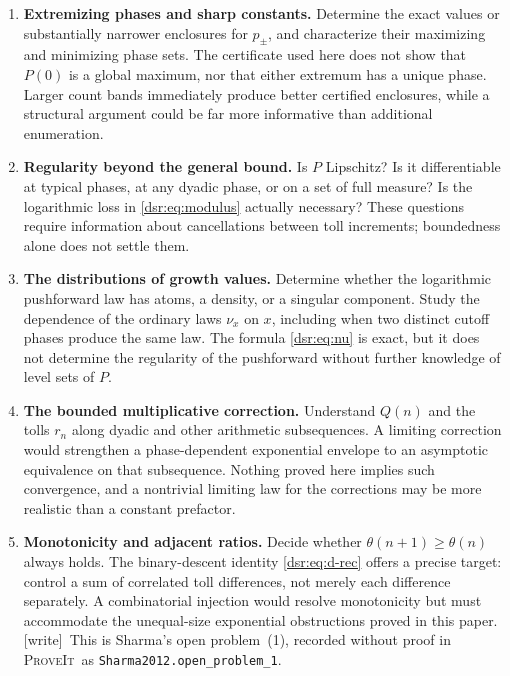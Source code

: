 \documentclass[11pt,a4paper]{article}
\numberwithin{equation}{section}
\theoremstyle{definition}
\theoremstyle{remark}
\newcommand{\repo}{\textsc{ProveIt}}
\newcommand{\wtag}{\textup{[write]}}
\newcommand{\lean}[1]{\nolinkurl{#1}}
\theoremstyle{definition}
\theoremstyle{plain}
\begin{document}
\begin{enumerate}[label=\textbf{\arabic*.},leftmargin=*]
\item \textbf{Extremizing phases and sharp constants.}
Determine the exact values or substantially narrower enclosures for
$p_\pm$, and characterize their maximizing and minimizing phase sets. The
certificate used here does not show that $P(0)$ is a global maximum, nor
that either extremum has a unique phase. Larger count bands immediately
produce better certified enclosures, while a structural argument could be
far more informative than additional enumeration.

\item \textbf{Regularity beyond the general bound.}
Is $P$ Lipschitz? Is it differentiable at typical phases, at any dyadic
phase, or on a set of full measure? Is the logarithmic loss in
\eqref{dsr:eq:modulus} actually necessary? These questions require information
about cancellations between toll increments; boundedness alone does not
settle them.

\item \textbf{The distributions of growth values.}
Determine whether the logarithmic pushforward law has atoms, a density, or
a singular component. Study the dependence of the ordinary laws $\nu_x$
on $x$, including when two distinct cutoff phases produce the same law.
The formula \eqref{dsr:eq:nu} is exact, but it does not determine the regularity
of the pushforward without further knowledge of level sets of $P$.

\item \textbf{The bounded multiplicative correction.}
Understand $Q(n)$ and the tolls $r_n$ along dyadic and other arithmetic
subsequences. A limiting correction would strengthen a phase-dependent
exponential envelope to an asymptotic equivalence on that subsequence.
Nothing proved here implies such convergence, and a nontrivial limiting
law for the corrections may be more realistic than a constant prefactor.

\item \textbf{Monotonicity and adjacent ratios.}
Decide whether $\theta(n+1)\ge\theta(n)$ always holds. The binary-descent
identity \eqref{dsr:eq:d-rec} offers a precise target: control a sum of
correlated toll differences, not merely each difference separately.
A combinatorial injection would resolve monotonicity but must accommodate
the unequal-size exponential obstructions proved in this paper.
\wtag\ This is Sharma's open problem~(1), recorded without proof in \repo\
as \lean{Sharma2012.open_problem_1}.


\end{enumerate}
\end{document}
